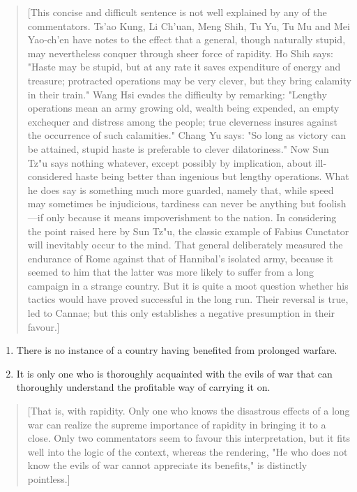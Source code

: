 \documentclass[10pt,a4paper]{book}
\begin{document}
{\small
\begin{quote}
[This concise and difficult sentence is not well explained by any of the commentators. Ts'ao Kung, Li Ch'uan, Meng Shih, Tu Yu, Tu Mu and Mei Yao-ch'en have notes to the effect that a general, though naturally stupid, may nevertheless conquer through sheer force of rapidity. Ho Shih says: "Haste may be stupid, but at any rate it saves expenditure of energy and treasure; protracted operations may be very clever, but they bring calamity in their train." Wang Hsi evades the difficulty by remarking: "Lengthy operations mean an army growing old, wealth being expended, an empty exchequer and distress among the people; true cleverness insures against the occurrence of such calamities." Chang Yu says: "So long as victory can be attained, stupid haste is preferable to clever dilatoriness." Now Sun Tz"u says nothing whatever, except possibly by implication, about ill-considered haste being better than ingenious but lengthy operations. What he does say is something much more guarded, namely that, while speed may sometimes be injudicious, tardiness can never be anything but foolish---if only because it means impoverishment to the nation. In considering the point raised here by Sun Tz"u, the classic example of Fabius Cunctator will inevitably occur to the mind. That general deliberately measured the endurance of Rome against that of Hannibal's isolated army, because it seemed to him that the latter was more likely to suffer from a long campaign in a strange country. But it is quite a moot question whether his tactics would have proved successful in the long run. Their reversal is true, led to Cannae; but this only establishes a negative presumption in their favour.]
\end{quote}
}

\begin{enumerate}[leftmargin=*, label=\arabic*., resume]
\item There is no instance of a country having benefited from prolonged warfare.
\item It is only one who is thoroughly acquainted with the evils of war that can thoroughly understand the profitable way of carrying it on.
\end{enumerate}

{\small
\begin{quote}
[That is, with rapidity. Only one who knows the disastrous effects of a long war can realize the supreme importance of rapidity in bringing it to a close. Only two commentators seem to favour this interpretation, but it fits well into the logic of the context, whereas the rendering, "He who does not know the evils of war cannot appreciate its benefits," is distinctly pointless.]
\end{quote}
}
\end{document}
